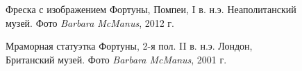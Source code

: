 \begin{appendices}
\begin{figure}[ht!]
\caption{Фреска с изображением Фортуны, Помпеи, I в. н.э. Неаполитанский музей. \footnotesize{Фото \textit{Barbara McManus}, 2012 г.}}
\label{pic:Cavemalum}
\end{figure}

\begin{figure}[ht!]
\caption{Мраморная статуэтка Фортуны, 2-я пол. II в. н.э. Лондон, Британский музей. \footnotesize{Фото \textit{Barbara McManus}, 2001 г.}}
\label{pic:Fortuna2cent}
\end{figure}


\end{appendices}
